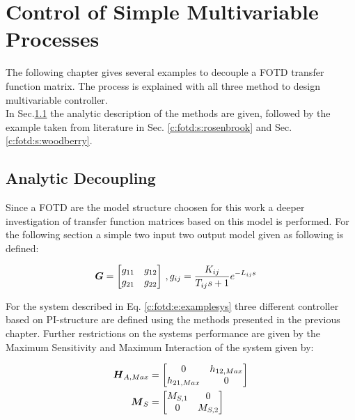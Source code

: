 \chapter{Control of Simple Multivariable Processes}
\label{c:fotd}

The following chapter gives several examples to decouple a FOTD transfer function matrix. The process is explained with all three method to design multivariable controller. \\

In Sec.\ref{c:fotd:s:analytic} the analytic description of the methods are given, followed by the example taken from literature in Sec. \ref{c:fotd:s:rosenbrook} and Sec.\ref{c:fotd:s:woodberry}.\\

\section{Analytic Decoupling}
\label{c:fotd:s:analytic}

Since a FOTD are the model structure choosen for this work a deeper investigation of transfer function matrices based on this model is performed. For the following section a simple two input two output model given as following is defined:

\begin{align}
\begin{split}
\mbox{\boldmath$G$} = \begin{bmatrix}
g_{11} & g_{12} \\
g_{21} & g_{22}
\end{bmatrix} & ~,g_{ij} = \frac{K_{ij}}{T_{ij} s +1 } e^{-L_{ij}s}
\end{split}
\label{c:fotd:e:examplesys}
\end{align}

For the system described in Eq. \ref{c:fotd:e:examplesys} three different controller based on PI-structure are defined using the methods presented in the previous chapter. Further restrictions on the systems performance are given by the Maximum Sensitivity and Maximum Interaction of the system given by:

\begin{align}
\begin{split}
\mbox{\boldmath$H$}_{A,Max} &= \begin{bmatrix}
0 & h_{12,Max} \\
h_{21,Max} & 0 
\end{bmatrix}\\
\mbox{\boldmath$M$}_{S} &= \begin{bmatrix}
M_{S,1} & 0 \\
0 & M_{S,2}
\end{bmatrix}
\end{split}
\label{c:fotd:e:restrictions}
\end{align}

